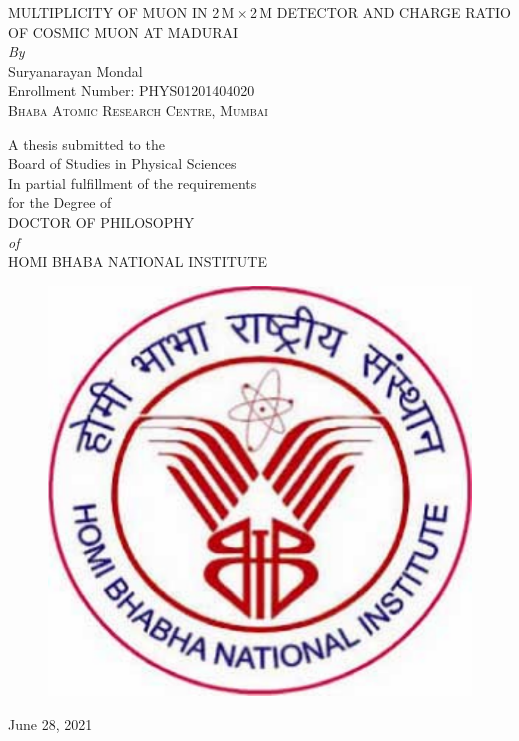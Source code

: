 \begin{center}

  \onehalfspacing
  
  \Huge
  \uppercase{Multiplicity of muon in 2\,m\,$\times$\,2\,m detector and charge ratio of cosmic muon at Madurai}\\
  
  \Large
  \vspace*{3em}\textit{By}\\
  Suryanarayan Mondal\\
  Enrollment Number: PHYS01201404020\\
  
  \Huge
  \vspace*{0.5em}
  \textsc{Bhaba Atomic Research Centre, Mumbai}
  
  \singlespacing
  \Large

  \vspace*{1.em}
  A thesis submitted to the\\
  Board of Studies in Physical Sciences\\
  \vspace*{1em}
  In partial fulfillment of the requirements\\
  for the Degree of\\
  
  \doublespacing
  \vspace*{1em}
  \uppercase{Doctor of Philosophy}\\
  \textit{of}\\
  \uppercase{Homi Bhaba National Institute}
  
  \vspace*{1em}
  \begin{figure}[h!]
    \centering
    \includegraphics[width=0.30\linewidth]{hbnilogo.pdf}
  \end{figure}
  
  \vspace*{1em}
  June 28, 2021
  
\end{center}
